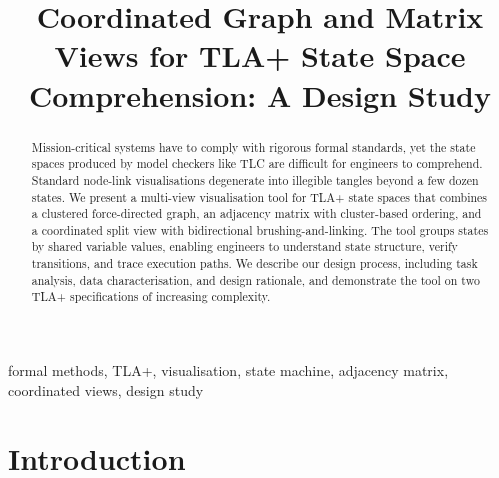 \documentclass[conference]{IEEEtran}
\begin{document}
\title{Coordinated Graph and Matrix Views for TLA+ State Space Comprehension: A Design Study}

\author{
 }

\maketitle

\begin{abstract}
Mission-critical systems have to comply with rigorous formal standards, yet the state spaces produced by model checkers like TLC are difficult for engineers to comprehend. Standard node-link visualisations degenerate into illegible tangles beyond a few dozen states. We present a multi-view visualisation tool for TLA+ state spaces that combines a clustered force-directed graph, an adjacency matrix with cluster-based ordering, and a coordinated split view with bidirectional brushing-and-linking. The tool groups states by shared variable values, enabling engineers to understand state structure, verify transitions, and trace execution paths. We describe our design process, including task analysis, data characterisation, and design rationale, and demonstrate the tool on two TLA+ specifications of increasing complexity.
\end{abstract}

\begin{IEEEkeywords}
formal methods, TLA+, visualisation, state machine, adjacency matrix, coordinated views, design study%
\end{IEEEkeywords}

\section{Introduction}
\end{document}

